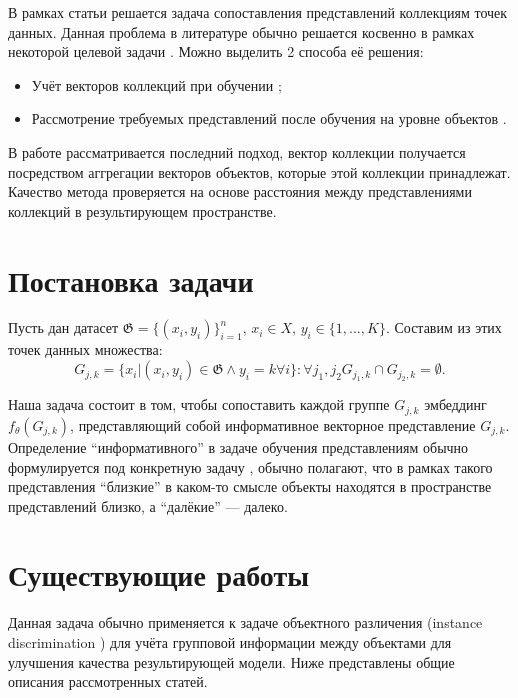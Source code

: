 \documentclass{article}
\begin{document}
В рамках статьи решается задача сопоставления представлений коллекциям точек данных. Данная проблема в литературе обычно решается косвенно в рамках некоторой целевой задачи \cite{SiameseNetworks, GroupFace, Pang2022UnsupervisedVR}. Можно выделить 2 способа её решения:

\begin{itemize}
    \item Учёт векторов коллекций при обучении \cite{Pang2022UnsupervisedVR};
    \item Рассмотрение требуемых представлений после обучения на уровне объектов \cite{SiameseNetworks}.
\end{itemize}

В работе рассматривается последний подход, вектор коллекции получается посредством аггрегации векторов объектов, которые этой коллекции принадлежат. Качество метода проверяется на основе расстояния между представлениями коллекций в результирующем пространстве.

\section{Постановка задачи}

Пусть дан датасет $\mathfrak{G} = \{(x_i, y_i)\}_{i = 1}^{n}$, $x_i \in X$, $y_i \in \{1, ..., K\}$. Составим из этих точек данных множества: \\
        $$G_{j, k} = \{x_i | (x_i, y_i) \in \mathfrak{G} \wedge y_i = k \forall i \} : \forall j_1, j_2 G_{j_1, k} \cap G_{j_2, k} = \emptyset.$$
        
Наша задача состоит в том, чтобы сопоставить каждой группе $G_{j, k}$ эмбеддинг $f_{\theta}(G_{j, k})$, представляющий собой информативное векторное представление $G_{j, k}$. Определение ``информативного'' в задаче обучения представлениям обычно формулируется под конкретную задачу \cite{Bengio2012RepresentationLA}, обычно полагают, что в рамках такого представления ``близкие'' в каком-то смысле объекты находятся в пространстве представлений близко, а ``далёкие'' --- далеко.

\section{Существующие работы}

Данная задача обычно применяется к задаче объектного различения (instance discrimination \cite{GroupFace}) для учёта групповой информации между объектами для улучшения качества результирующей модели. Ниже представлены общие описания рассмотренных статей.
\end{document}

